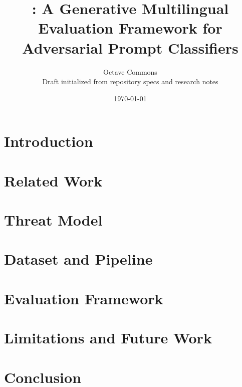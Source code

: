 \documentclass[11pt]{article}
\title{\system: A Generative Multilingual Evaluation Framework for Adversarial Prompt Classifiers}
\author{Octave Commons\\\normalsize Draft initialized from repository specs and research notes}
\date{\today}
\begin{document}
\maketitle

\begin{abstract}

\end{abstract}

\section{Introduction}


\section{Related Work}


\section{Threat Model}


\section{Dataset and Pipeline}


\section{Evaluation Framework}


\section{Limitations and Future Work}


\section{Conclusion}




\end{document}
